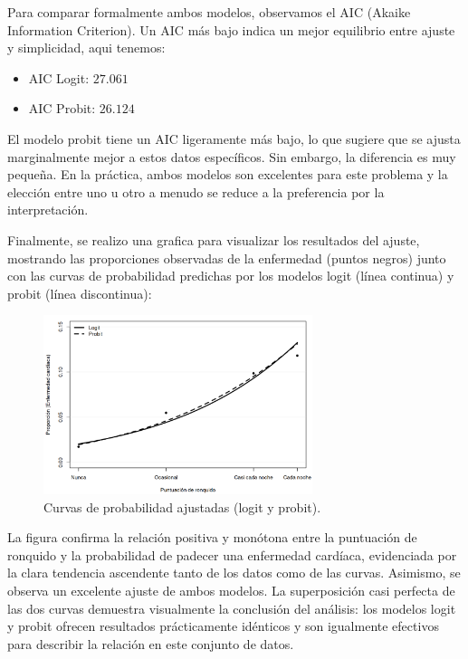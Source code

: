 Para comparar formalmente ambos modelos, observamos el AIC (Akaike Information Criterion). Un AIC más bajo indica un mejor equilibrio entre ajuste y simplicidad, aqui tenemos:
\begin{itemize}
    \item AIC Logit: $27.061$
    \item AIC Probit: $26.124$
\end{itemize}
El modelo probit tiene un AIC ligeramente más bajo, lo que sugiere que se ajusta marginalmente mejor a estos datos específicos. Sin embargo, la diferencia es muy pequeña. En la práctica, ambos modelos son excelentes para este problema y la elección entre uno u otro a menudo se reduce a la preferencia por la interpretación.

Finalmente, se realizo una grafica para visualizar los resultados del ajuste, mostrando las proporciones observadas de la enfermedad (puntos negros) junto con las curvas de probabilidad predichas por los modelos logit (línea continua) y probit (línea discontinua):

\begin{figure}[H]
    \centering
    \includegraphics[width=0.7\textwidth]{images/snoring_glm_curves.png}
    \caption{Curvas de probabilidad ajustadas (logit y probit).}
    \label{fig:3}
\end{figure}

La figura confirma la relación positiva y monótona entre la puntuación de ronquido y la probabilidad de padecer una enfermedad cardíaca, evidenciada por la clara tendencia ascendente tanto de los datos como de las curvas. Asimismo, se observa un excelente ajuste de ambos modelos. La superposición casi perfecta de las dos curvas demuestra visualmente la conclusión del análisis: los modelos logit y probit ofrecen resultados prácticamente idénticos y son igualmente efectivos para describir la relación en este conjunto de datos.

